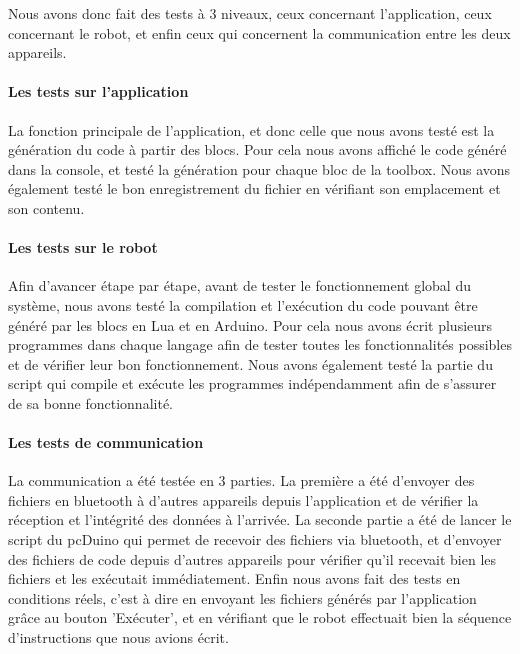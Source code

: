 \documentclass[12pt,francais]{report}
\begin{document}
Nous avons donc fait des tests à 3 niveaux, ceux concernant l'application, ceux concernant le robot, et enfin ceux qui concernent la communication entre les deux appareils.

\paragraph*{Les tests sur l'application\\}

La fonction principale de l'application, et donc celle que nous avons testé est la génération du code à partir des blocs. Pour cela nous avons affiché le code généré dans la console, et testé la génération pour chaque bloc de la toolbox. Nous avons également testé le bon enregistrement du fichier en vérifiant son emplacement et son contenu.

\paragraph*{Les tests sur le robot\\}

Afin d'avancer étape par étape, avant de tester le fonctionnement global du système, nous avons testé la compilation et l'exécution du code pouvant être généré par les blocs en Lua et en Arduino. Pour cela nous avons écrit plusieurs programmes dans chaque langage afin de tester toutes les fonctionnalités possibles et de vérifier leur bon fonctionnement.
Nous avons également testé la partie du script qui compile et exécute les programmes indépendamment afin de s'assurer de sa bonne fonctionnalité.

\paragraph*{Les tests de communication\\}

La communication a été testée en 3 parties. La première a été d'envoyer des fichiers en bluetooth à d'autres appareils depuis l'application et de vérifier la réception et l'intégrité des données à l'arrivée. La seconde partie a été de lancer le script du pcDuino qui permet de recevoir des fichiers via bluetooth, et d'envoyer des fichiers de code depuis d'autres appareils pour vérifier qu'il recevait bien les fichiers et les exécutait immédiatement. Enfin nous avons fait des tests en conditions réels, c'est à dire en envoyant les fichiers générés par l'application grâce au bouton 'Exécuter', et en vérifiant que le robot effectuait bien la séquence d'instructions que nous avions écrit.
\end{document}
